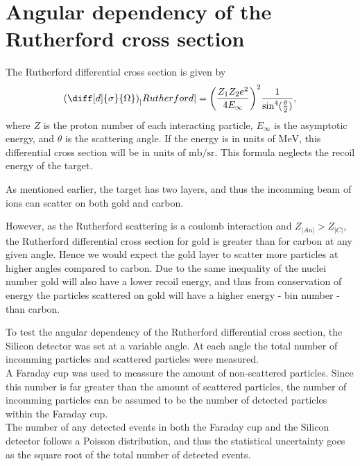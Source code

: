\section{Angular dependency of the Rutherford cross section}
The Rutherford differential cross section \parencite[p. 16]{noteBB} is given by
\begin{align}\label{eq:cross}
    {\left( \diff[d]{\sigma}{\Omega} \right)}_|Rutherford| =
    {\left(\frac{Z_1Z_2 e^2}{4E_{\infty}} \right)}^2
    \frac{1}{{{\sin}^4(\frac{\theta}{2})}},
\end{align}
where $Z$ is the proton number of each interacting particle, $E_{\infty}$ is
the asymptotic energy, and $\theta$ is the scattering angle. If the energy is
in units of $\si{\mega\electronvolt}$, this differential cross section will be in units
of $\si{\milli\barn\per\steradian}$.
This formula neglects the recoil energy of the target.

As mentioned earlier, the target has two layers, and thus the incomming beam of
ions can scatter on both gold and carbon. 

However, as the Rutherford scattering is a coulomb interaction and $Z_|Au| >
Z_|C|$, the Rutherford differential cross section for gold is greater than for carbon at any given angle. Hence we would expect the gold layer to scatter more particles at higher angles compared to carbon. Due to the same inequality of the nuclei number gold will also have a lower recoil energy, and thus from conservation of energy the particles scattered on gold will have a higher energy - bin number - than carbon.

To test the angular dependency of the Rutherford differential cross section,
the Silicon detector was set at a variable angle. At each angle the total
number of incomming particles and scattered particles were measured.\\

A Faraday cup was used to meassure the amount of non-scattered particles. 
Since this number is far greater than the amount of scattered particles, the
number of incomming particles can be assumed to be the number of detected
particles within the Faraday cup.\\

The number of any detected events in both the Faraday cup and the Silicon
detector follows a Poisson distribution, and thus the statistical uncertainty
goes as the square root of the total number of detected events.\\

